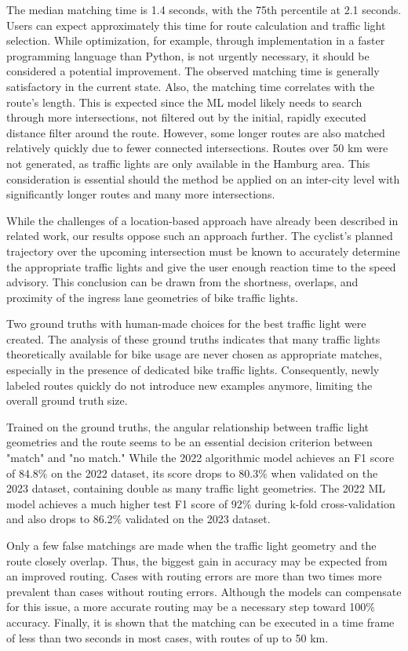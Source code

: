 The median matching time is 1.4 seconds, with the 75th percentile at 2.1 seconds. Users can expect approximately this time for route calculation and traffic light selection. While optimization, for example, through implementation in a faster programming language than Python, is not urgently necessary, it should be considered a potential improvement. The observed matching time is generally satisfactory in the current state. Also, the matching time correlates with the route's length. This is expected since the ML model likely needs to search through more intersections, not filtered out by the initial, rapidly executed distance filter around the route. However, some longer routes are also matched relatively quickly due to fewer connected intersections. Routes over 50 km were not generated, as traffic lights are only available in the Hamburg area. This consideration is essential should the method be applied on an inter-city level with significantly longer routes and many more intersections.

\begin{Summary}
While the challenges of a location-based approach have already been described in related work, our results oppose such an approach further. The cyclist's planned trajectory over the upcoming intersection must be known to accurately determine the appropriate traffic lights and give the user enough reaction time to the speed advisory. This conclusion can be drawn from the shortness, overlaps, and proximity of the ingress lane geometries of bike traffic lights. 

Two ground truths with human-made choices for the best traffic light were created. The analysis of these ground truths indicates that many traffic lights theoretically available for bike usage are never chosen as appropriate matches, especially in the presence of dedicated bike traffic lights. Consequently, newly labeled routes quickly do not introduce new examples anymore, limiting the overall ground truth size. 

Trained on the ground truths, the angular relationship between traffic light geometries and the route seems to be an essential decision criterion between "match" and "no match." While the 2022 algorithmic model achieves an F1 score of 84.8\% on the 2022 dataset, its score drops to 80.3\% when validated on the 2023 dataset, containing double as many traffic light geometries. The 2022 ML model achieves a much higher test F1 score of 92\% during k-fold cross-validation and also drops to 86.2\% validated on the 2023 dataset. 

Only a few false matchings are made when the traffic light geometry and the route closely overlap. Thus, the biggest gain in accuracy may be expected from an improved routing. Cases with routing errors are more than two times more prevalent than cases without routing errors. Although the models can compensate for this issue, a more accurate routing may be a necessary step toward 100\% accuracy. Finally, it is shown that the matching can be executed in a time frame of less than two seconds in most cases, with routes of up to 50 km. 
\end{Summary}

